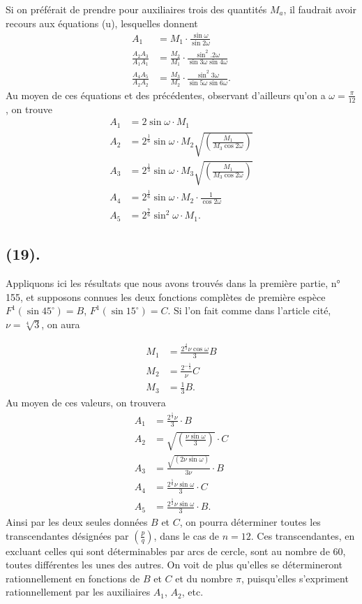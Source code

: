 \documentclass{article}
\begin{document}
Si on préférait de prendre pour auxiliaires trois des quantités $M_{a}$, il faudrait avoir recours aux équations (u), lesquelles donnent
\[ \begin{aligned} A_{1}&=M_{1}\cdot\frac{\sin\omega}{\sin 2\omega}\\ \frac{A_{2}A_{3}}{A_{1}A_{1}}&=\frac{M_{2}}{M_{1}}\cdot\frac{\sin^{2}.2\omega}{\sin 3\omega\sin 4\omega}\\ \frac{A_{4}A_{5}}{A_{2}A_{2}}&=\frac{M_{3}}{M_{2}}\cdot\frac{\sin^{2}3\omega}{\sin 5\omega\sin 6\omega}. \end{aligned} \]
Au moyen de ces équations et des précédentes, observant d'ailleurs qu'on a $\omega=\frac{\pi}{12}$, on trouve
\[ \begin{aligned} A_{1}&=2\sin\omega\cdot M_{1}\\ A_{2}&=2^{\frac{1}{6}}\sin\omega\cdot M_{2}\sqrt{\left(\frac{M_{1}}{M_{3}\cos 2\omega}\right)}\\ A_{3}&=2^{\frac{1}{3}}\sin\omega\cdot M_{3}\sqrt{\left(\frac{M_{1}}{M_{3}\cos 2\omega}\right)}\\ A_{4}&=2^{\frac{1}{6}}\sin\omega\cdot M_{2}\cdot\frac{1}{\cos 2\omega}\\ A_{5}&=2^{\frac{7}{6}}\sin^{2}\omega\cdot M_{1}. \end{aligned} \]

\subsection*{(19).}

Appliquons ici les résultats que nous avons trouvés dans la première partie, n° 155, et supposons connues les deux fonctions complètes de première espèce $F^{1}(\sin 45^{\circ})=B$, $F^{1}(\sin 15^{\circ})=C$. Si l'on fait comme dans l'article cité, $\nu=\sqrt[4]{3}$, on aura

\[ \begin{aligned} M_{1}&=\frac{2^{\frac{4}{3}}\nu\cos\omega}{3}B\\ M_{2}&=\frac{2^{-\frac{1}{3}}}{\nu}C\\ M_{3}&=\tfrac{1}{3}B. \end{aligned} \]
Au moyen de ces valeurs, on trouvera
\[ \begin{aligned} A_{1}&=\frac{2^{\frac{1}{3}}\nu}{3}\cdot B\\ A_{2}&=\sqrt{\left(\frac{\nu\sin\omega}{3}\right)}\cdot C\\ A_{3}&=\frac{\sqrt{(2\nu\sin\omega)}}{3\nu}\cdot B\\ A_{4}&=\frac{2^{\frac{5}{6}}\nu\sin\omega}{3}\cdot C\\ A_{5}&=\frac{2^{\frac{1}{2}}\nu\sin\omega}{3}\cdot B. \end{aligned} \]
Ainsi par les deux seules données $B$ et $C$, on pourra déterminer toutes les transcendantes désignées par $\left(\frac{p}{q}\right)$, dans le cas de $n=12$. Ces transcendantes, en excluant celles qui sont déterminables par arcs de cercle, sont au nombre de 60, toutes différentes les unes des autres. On voit de plus qu'elles se détermineront rationnellement en fonctions de $B$ et $C$ et du nombre $\pi$, puisqu'elles s'expriment rationnellement par les auxiliaires $A_{1}$, $A_{2}$, etc.
\end{document}
